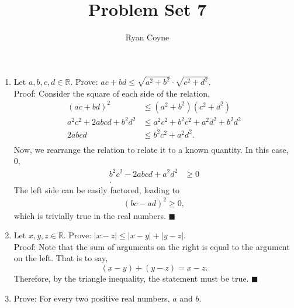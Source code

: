 \documentclass[12pt]{article}
\newcommand{\R}{\mathbb{R}}
\newcommand{\qed}{\(\blacksquare\)}
\begin{document}
    \title{Problem Set 7}
    \author{Ryan Coyne}
    \maketitle

    \begin{enumerate}
        \item Let \(a, b, c, d \in\R\). Prove: \(ac + bd \leq \sqrt{a^2+b^2}\cdot\sqrt{c^2+d^2}\).\\ Proof: Consider the square of each side of the relation,
        \begin{equation*}
            \begin{split}
                (ac+bd)^2&\leq(a^2+b^2)(c^2+d^2)\\
                a^2c^2 + 2abcd + b^2d^2 &\leq a^2c^2 + b^2c^2 + a^2d^2 + b^2d^2\\
                2abcd &\leq b^2c^2 + a^2d^2.\\
            \end{split}
        \end{equation*}
        Now, we rearrange the relation to relate it to a known quantity. In this case, 0,
        \begin{equation*}
            \begin{split}
                b^2c^2-2abcd+a^2d^2&\geq 0\\.                
            \end{split}            
        \end{equation*}
        The left side can be easily factored, leading to
        \begin{equation*}
            \begin{split}
                (bc-ad)^2\geq 0,
            \end{split}
        \end{equation*}
        which is trivially true in the real numbers. \qed
        \item Let \(x, y, z \in\R\). Prove: \(|x-z|\leq|x-y|+|y-z|\).\\ Proof: Note that the sum of arguments on the right is equal to the argument on the left. That is to say,
        \begin{equation*}
            (x-y)+(y-z) = x-z.
        \end{equation*}
        Therefore, by the triangle inequality, the statement must be true. \qed
        \item Prove: For every two positive real numbers, \(a\) and \(b\). 

\end{enumerate}
\end{document}
